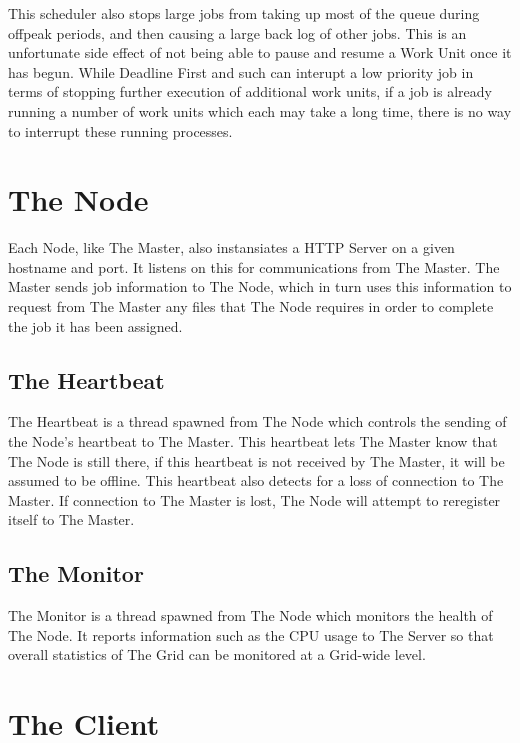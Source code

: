 This scheduler also stops large jobs from taking up most of the queue during offpeak periods, and then causing a large back log of other jobs. This is an unfortunate side effect of not being able to pause and resume a Work Unit once it has begun. While Deadline First and such can interupt a low priority job in terms of stopping further execution of additional work units, if a job is already running a number of work units which each may take a long time, there is no way to interrupt these running processes.

\section{The Node}
\label{thenode}

Each Node, like The Master, also instansiates a HTTP Server on a given hostname and port. It listens on this for communications from The Master. The Master sends job information to The Node, which in turn uses this information to request from The Master any files that The Node requires in order to complete the job it has been assigned.

\subsection{The Heartbeat}
\label{theheartbeat}

The Heartbeat is a thread spawned from The Node which controls the sending of the Node's heartbeat to The Master. This heartbeat lets The Master know that The Node is still there, if this heartbeat is not received by The Master, it will be assumed to be offline. This heartbeat also detects for a loss of connection to The Master. If connection to The Master is lost, The Node will attempt to reregister itself to The Master. 

\subsection{The Monitor}
\label{themonitor}

The Monitor is a thread spawned from The Node which monitors the health of The Node. It reports information such as the CPU usage to The Server so that overall statistics of The Grid can be monitored at a Grid-wide level.

\section{The Client}
\label{theclient}

